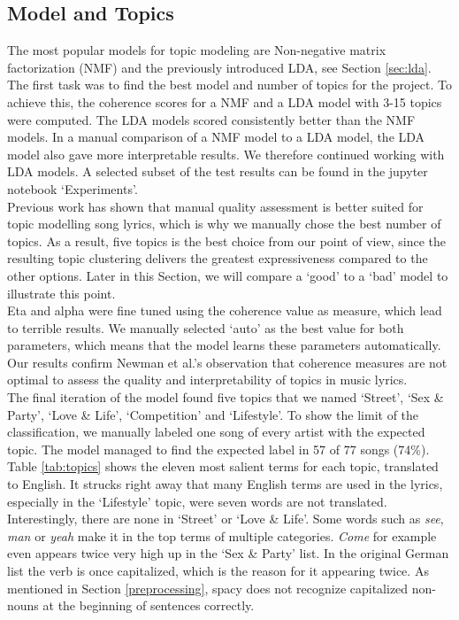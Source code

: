 \documentclass[conference]{IEEEtran}
\begin{document}
\subsection{Model and Topics}
The most popular models for topic modeling are Non-negative matrix factorization (NMF) and the previously introduced LDA, see Section \ref{sec:lda}. The first task was to find the best model and number of topics for the project. To achieve this, the coherence scores for a NMF and a LDA model with 3-15 topics were computed. The LDA models scored consistently better than the NMF models. In a manual comparison of a NMF model to a LDA model, the LDA model also gave more interpretable results. We therefore continued working with LDA models. A selected subset of the test results can be found in the jupyter notebook {\lq}Experiments{\rq}.\\
Previous work has shown \cite{evaluation} that manual quality assessment is better suited for topic modelling song lyrics, which is why we manually chose the best number of topics. As a result, five topics is the best choice from our point of view, since the resulting topic clustering delivers the greatest expressiveness compared to the other options. Later in this Section, we will compare a {\lq}good{\rq} to a {\lq}bad{\rq} model to illustrate this point.\\
Eta and alpha were fine tuned using the coherence value as measure, which lead to terrible results. We manually selected {\lq}auto{\rq} as the best value for both parameters, which means that the model learns these parameters automatically. Our results confirm Newman et al.'s observation \cite{evaluation} that coherence measures are not optimal to assess the quality and interpretability of topics in music lyrics.\\
The final iteration of the model found five topics that we named {\lq}Street{\rq}, {\lq}Sex \& Party{\rq}, {\lq}Love \& Life{\rq}, {\lq}Competition{\rq} and {\lq}Lifestyle{\rq}. To show the limit of the classification, we manually labeled one song of every artist with the expected topic. The model managed to find the expected label in 57 of 77 songs (74\%). Table \ref{tab:topics} shows the eleven most salient terms for each topic, translated to English. It strucks right away that many English terms are used in the lyrics, especially in the {\lq}Lifestyle{\rq} topic, were seven words are not translated. Interestingly, there are none in {\lq}Street{\rq} or {\lq}Love \& Life{\rq}. Some words such as \textit{see}, \textit{man} or \textit{yeah} make it in the top terms of multiple categories. \textit{Come} for example even appears twice very high up in the {\lq}Sex \& Party{\rq} list. In the original German list the verb is once capitalized, which is the reason for it appearing twice. As mentioned in Section \ref{preprocessing}, spacy does not recognize capitalized non-nouns at the beginning of sentences correctly.
\end{document}
